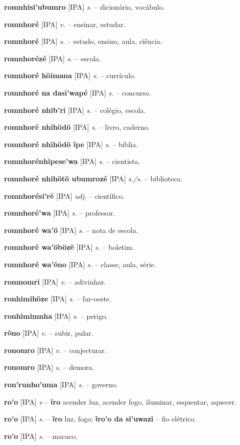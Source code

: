 \textbf{romnhisi'ubumro} [IPA] \textit{s.} -- dicionário, vocábulo.

\textbf{romnhoré} [IPA] \textit{v.} -- ensinar, estudar.

\textbf{romnhoré} [IPA] \textit{s.} -- estudo, ensino, aula, ciência.

\textbf{romnhorézé} [IPA] \textit{s.} -- escola.

\textbf{romnhoré höimana} [IPA] \textit{s.} -- currículo.

\textbf{romnhoré na dasi'wapé} [IPA] \textit{s.} -- concurso.

\textbf{romnhoré nhib'ri} [IPA] \textit{s.} -- colégio, escola.

\textbf{romnhoré nhihödö} [IPA] \textit{s.} -- livro, caderno.

\textbf{romnhoré nhihödö ĩpe} [IPA] \textit{s.} -- bíblia.

\textbf{romnhorénhipese'wa} [IPA] \textit{s.} -- cientista.

\textbf{romnhoré nhihötö ubumrozé} [IPA] \textit{s./s.} -- biblioteca.

\textbf{romnhorési'rẽ} [IPA] \textit{adj.} -- científico.

\textbf{romnhoré'wa} [IPA] \textit{s.} -- professor.

\textbf{romnhoré wa'ö} [IPA] \textit{s.} -- nota de escola.

\textbf{romnhoré wa'öbözẽ} [IPA] \textit{s.} -- boletim.

\textbf{romnhoré wa'õno} [IPA] \textit{s.} -- classe, aula, série.

\textbf{romnomri} [IPA] \textit{v.} -- adivinhar.

\textbf{ronhimihöze} [IPA] \textit{s.} -- far-oeste.

\textbf{ronhimimnha} [IPA] \textit{s.} -- perigo.

\textbf{rõno} [IPA] \textit{v.} -- subir, pular.

\textbf{ronomro} [IPA] \textit{v.} -- conjecturar.

\textbf{ronomro} [IPA] \textit{s.} -- demora.

\textbf{ron'runho'uma} [IPA] \textit{s.} -- governo.

\textbf{ro'o} [IPA] \textit{v} -- \textbf{ĩro} acender luz, acender fogo, iluminar, esquentar, aquecer.

\textbf{ro'o} [IPA] \textit{s.} -- \textbf{ĩro} luz, fogo; \textbf{ĩro'o da si'uwazi} -- fio elétrico.

\textbf{ro'o} [IPA] \textit{s.} -- macaco.

